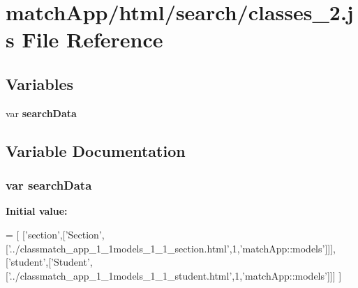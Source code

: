 \section{match\+App/html/search/classes\+\_\+2.js File Reference}
\label{classes__2_8js}
\subsection*{Variables}
\begin{DoxyCompactItemize}
\item 
var {\bf search\+Data}
\end{DoxyCompactItemize}


\subsection{Variable Documentation}
\subsubsection[{search\+Data}]{\setlength{\rightskip}{0pt plus 5cm}var search\+Data}\label{classes__2_8js_ad01a7523f103d6242ef9b0451861231e}
{\bfseries Initial value\+:}
\begin{DoxyCode}
=
[
  [\textcolor{stringliteral}{'section'},[\textcolor{stringliteral}{'Section'},[\textcolor{stringliteral}{'../classmatch\_app\_1\_1models\_1\_1\_section.html'},1,\textcolor{stringliteral}{'matchApp::models'}]]],
  [\textcolor{stringliteral}{'student'},[\textcolor{stringliteral}{'Student'},[\textcolor{stringliteral}{'../classmatch\_app\_1\_1models\_1\_1\_student.html'},1,\textcolor{stringliteral}{'matchApp::models'}]]]
]
\end{DoxyCode}

